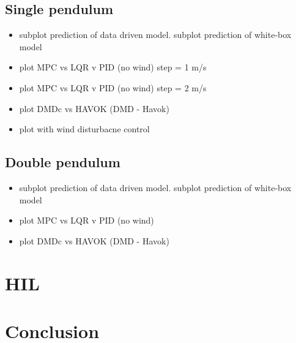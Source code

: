         \FloatBarrier\subsection{Single pendulum}

            \begin{itemize}
                \item subplot prediction of data driven model. subplot prediction of white-box model
                \item plot MPC vs LQR v PID (no wind) step = 1 m/s
                \item plot MPC vs LQR v PID (no wind) step = 2 m/s
                \item plot DMDc vs HAVOK (DMD - Havok)
                \item plot with wind disturbacne control
            \end{itemize}

        \FloatBarrier\subsection{Double pendulum}

            \begin{itemize}
                \item subplot prediction of data driven model. subplot prediction of white-box model
                \item plot MPC vs LQR v PID (no wind)
                \item plot DMDc vs HAVOK (DMD - Havok)
            \end{itemize}

    \section{HIL}

    \section{Conclusion}



